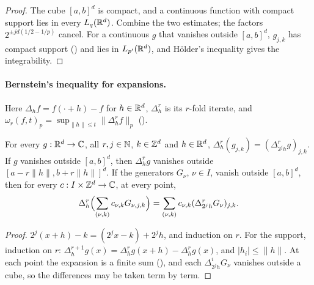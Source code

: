 \begin{proof}
\leanok
{}
The cube $[a, b]^d$ is compact, and a continuous function with compact support lies in every
$L_q(\mathbb{R}^d)$. Combine the two estimates; the factors $2^{\pm jd(1/2 - 1/p)}$ cancel. For a
continuous $g$ that vanishes outside $[a, b]^d$, $g_{j,k}$ has compact support
() and lies in $L_{p'}(\mathbb{R}^d)$, and H\"older's inequality gives the
integrability.
\end{proof}

\paragraph{Bernstein's inequality for expansions.}
Here $\Delta_h f = f(\cdot + h) - f$ for $h \in \mathbb{R}^d$, $\Delta_h^r$ is its $r$-fold iterate, and
$\omega_r(f, t)_p = \sup_{\|h\| \leq t} \|\Delta_h^r f\|_p$ ().

\begin{lemma}
\label{lem:daub-rd-expansion-differences}
\leanok
{}
For every $g : \mathbb{R}^d \to \mathbb{C}$, all $r, j \in \mathbb{N}$, $k \in \mathbb{Z}^d$ and $h \in \mathbb{R}^d$,
$\Delta_h^r (g_{j,k}) = (\Delta_{2^j h}^r g)_{j,k}$. If $g$ vanishes outside $[a, b]^d$, then
$\Delta_h^r g$ vanishes outside $[a - r\|h\|, b + r\|h\|]^d$. If the generators $G_\nu$,
$\nu \in I$, vanish outside $[a, b]^d$, then for every $c : I \times \mathbb{Z}^d \to \mathbb{C}$, at every
point,
\[
  \Delta_h^r \Bigl(\sum_{(\nu, k)} c_{\nu,k} G_{\nu,j,k}\Bigr)
  = \sum_{(\nu, k)} c_{\nu,k} (\Delta_{2^j h}^r G_\nu)_{j,k} .
\]
\end{lemma}

\begin{proof}
\leanok
{}
$2^j (x + h) - k = (2^j x - k) + 2^j h$, and induction on $r$. For the support, induction on
$r$: $\Delta_h^{r+1} g(x) = \Delta_h^r g(x + h) - \Delta_h^r g(x)$, and $|h_i| \leq \|h\|$. At
each point the expansion is a finite sum (), and each
$\Delta_{2^j h}^i G_\nu$ vanishes outside a cube, so the differences may be taken term by term.
\end{proof}

